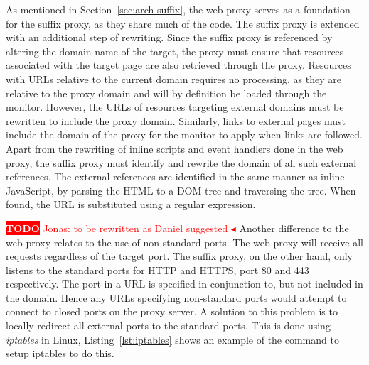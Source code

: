 \documentclass{llncs}
\newcommand{\todo}[1]{\colorbox{red}{\textcolor{white}{\sffamily\bfseries\scriptsize TODO}} \textcolor{red}{#1} \textcolor{red}{$\blacktriangleleft$}}
\begin{document}


%

As mentioned in Section~\ref{sec:arch-suffix}, the web proxy serves as a 
foundation for the suffix proxy, as they share much of the code. The suffix proxy is extended with an additional step of rewriting. 
Since the suffix proxy is referenced by altering the domain name of the target, 
the proxy must ensure that resources associated with the target page are also 
retrieved through the proxy. Resources with URLs relative to the current domain 
requires no processing, as they are relative to the proxy domain and will by 
definition be loaded through the monitor. 
However, the URLs of resources targeting external domains must be rewritten to 
include the proxy domain. Similarly, links to external pages must include the domain of the proxy
for the %
monitor%
to apply 
when links are followed.
Apart from the rewriting of inline 
scripts and event handlers done in the web proxy, the suffix proxy must 
identify and rewrite the domain of all such external references. 
The external references are identified in the same manner as inline JavaScript, 
by parsing the HTML to a DOM-tree and traversing the tree. When found, the 
URL is substituted using a regular expression.%

\todo{Jonas: to be rewritten as Daniel suggested}
Another difference to the web proxy relates to the use of non-standard ports.
The web proxy will receive all requests regardless of the target port. The 
suffix proxy, on the other hand, only listens to the standard ports for HTTP and HTTPS, port 80 and 
443 respectively. The port in a URL is specified in conjunction to, but not included in the domain.
Hence any URLs specifying non-standard ports would attempt to connect to closed 
ports on the proxy server. A solution to this problem is to locally redirect 
all external ports to the standard ports. This is done using \emph{iptables} in Linux, 
Listing~\ref{lst:iptables} shows an example of the command to setup iptables to do this.
\end{document}
